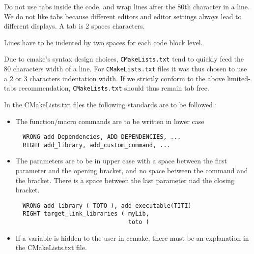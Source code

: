 \documentclass{article}
\begin{document}
Do not use tabs inside the code, and wrap lines after the 80th
character in a line. We do not like tabs because different editors and editor
settings always lead to different displays.
A tab is 2 spaces characters.

Lines have to be indented by two spaces for each code block level.

Due to cmake's syntax design choices, \texttt{CMakeLists.txt} tend to
quickly feed the 80 characters width of a line. For \texttt{CMakeLists.txt}
files it was thus chosen to use a 2 or 3 characters indentation width.
If we strictly conform to the above limited-tabs recommendation,
\texttt{CMakeLists.txt} should thus remain tab free.

In the CMakeLists.txt files the following standards are to be followed :
\begin{itemize}
\item The function/macro commands are to be written in lower case \\
\begin{verbatim}
  WRONG add_Dependencies, ADD_DEPENDENCIES, ...
  RIGHT add_library, add_custom_command, ...
\end{verbatim}
\item The parameters are to be in upper case with a space between the first 
  parameter and the opening bracket, and no space between the command and
  the bracket. There is a space between the last parameter nad the closing 
  bracket.
\begin{verbatim}
  WRONG add_library ( TOTO ), add_executable(TITI)
  RIGHT target_link_libraries ( myLib,
                                toto )
\end{verbatim}                                
\item If a variable is hidden to the user in ccmake, there must be an 
  explanation in the CMakeLists.txt file.
\end{itemize}
\end{document}
